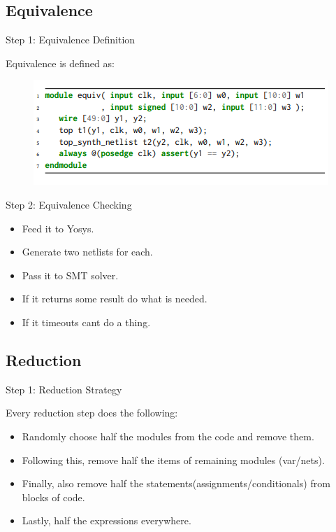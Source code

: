 \documentclass[notes, xcolor=dvipsnames]{beamer}
\begin{document}
    \subsection{Equivalence}
    \begin{frame}{Step 1: Equivalence Definition}

        Equivalence is defined as:

        \begin{figure}
            \includegraphics{Equivalence_Code.PNG}
        \end{figure}

    \end{frame}

    \begin{frame}{Step 2: Equivalence Checking}

        \begin{itemize} 
            \item Feed it to Yosys.
            \item Generate two netlists for each.
            \item Pass it to SMT solver. 
            \item If it returns some result do what is needed.
            \item If it timeouts cant do a thing.
        \end{itemize}

    \end{frame}
    

    \subsection{Reduction}
    
    \begin{frame}{Step 1: Reduction Strategy}

        Every reduction step does the following:
        \begin{itemize}
            \item Randomly choose half the modules from the code and remove them. 
            \item Following this, remove half the items of remaining modules (var/nets).
            \item Finally, also remove half the statements(assignments/conditionals) from blocks of code.
            \item Lastly, half the expressions everywhere.
        \end{itemize}

    \end{frame}
\end{document}
